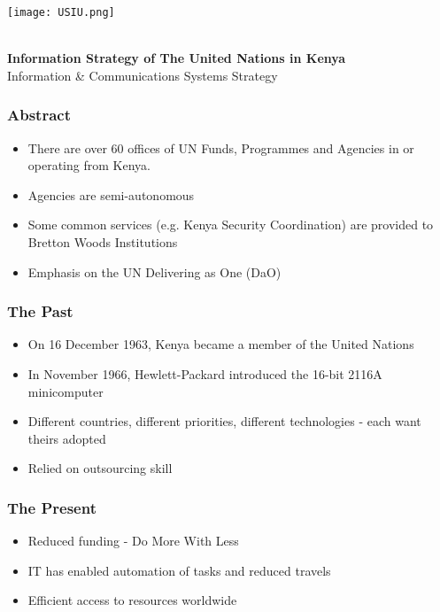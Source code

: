 \documentclass{beamer}
\begin{document}
\author[Arthur Buliva]{arthur.buliva@unon.org}


\begin{frame}
\begin{center}
\begin{normalsize}
\texttt{[image: USIU.png]}\\
\textbf{}\end{normalsize}\\
\vspace{1in}
\textbf{Information Strategy of The United Nations in Kenya} \\
Information \& Communications Systems Strategy \\
\end{center}
\end{frame}

\begin{frame}
  \frametitle{Abstract}
  \begin{itemize}
\item There are over 60 offices of UN Funds, Programmes and Agencies in or operating from Kenya.
\item Agencies are semi-autonomous
\item Some common services (e.g. Kenya Security Coordination) are provided to Bretton Woods Institutions
\item Emphasis on the UN Delivering as One (DaO)
\end{itemize}
\end{frame}

\begin{frame}
  \frametitle{The Past}
  \begin{itemize}
\item On 16 December 1963, Kenya became a member of the United Nations
\pause
\item In November 1966, Hewlett-Packard introduced the 16-bit 2116A minicomputer
\item Different countries, different priorities, different technologies - each want theirs adopted
\item Relied on outsourcing skill
\end{itemize}
\end{frame}

\begin{frame}
\frametitle{The Present}
  \begin{itemize}
\item Reduced funding - Do More With Less
\item IT has enabled automation of tasks and reduced travels
\item Efficient access to resources worldwide
\end{itemize}
\end{frame}
\end{document}
